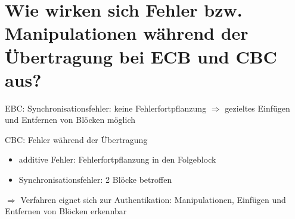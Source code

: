 \documentclass{article}
\begin{document}
	\section*{Wie wirken sich Fehler bzw. Manipulationen während der Übertragung bei ECB und CBC aus?}
	EBC: Synchronisationsfehler: keine Fehlerfortpflanzung $\Rightarrow$ gezieltes Einfügen und Entfernen von Blöcken möglich
	
	CBC: Fehler während der Übertragung
	\begin{itemize}
		\item additive Fehler: Fehlerfortpflanzung in den Folgeblock
		\item Synchronisationsfehler: 2 Blöcke betroffen
	\end{itemize}
	$\Rightarrow$ Verfahren eignet sich zur Authentikation: Manipulationen, Einfügen und Entfernen von Blöcken erkennbar
	
\end{document}

